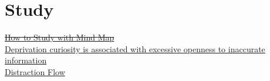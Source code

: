 \documentclass[12pt,a4paper,hidelinks]{memoir}
\begin{document}
\section{Study}
\label{sec:study}
\href{run:../../Documents/how_to_study_with_mind_maps.pdf}{\sout{How to Study with Mind Map}}\\
\href{https://www.sciencedirect.com/science/article/pii/S009265662200040X}{Deprivation curiosity is associated with excessive openness to inaccurate information}\\
\href{./distraction_flow/distraction_flow.pdf}{Distraction Flow}
\end{document}
